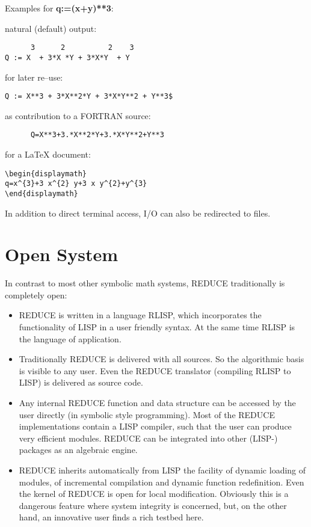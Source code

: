 Examples for {\bf q:=(x+y)**3}:

natural (default) output:
\begin{verbatim}
      3      2          2    3
Q := X  + 3*X *Y + 3*X*Y  + Y
\end{verbatim}
for later re--use:
\begin{verbatim}
Q := X**3 + 3*X**2*Y + 3*X*Y**2 + Y**3$
\end{verbatim}
as contribution to a FORTRAN source:
\begin{verbatim}
      Q=X**3+3.*X**2*Y+3.*X*Y**2+Y**3
\end{verbatim}
for a LaTeX document:
\begin{verbatim}
\begin{displaymath}
q=x^{3}+3 x^{2} y+3 x y^{2}+y^{3}
\end{displaymath}
\end{verbatim}
 
In addition to direct terminal access, I/O can also be redirected to
files.
\section{Open System}
 
In contrast to most other symbolic math systems, {\small REDUCE}
traditionally is completely open:
 
\begin{itemize}
\item {\small REDUCE} is written in a language {\small RLISP}, which
incorporates the functionality of {\small LISP} in a user friendly syntax.
At the same time {\small RLISP} is the language of application.

\item Traditionally {\small REDUCE} is delivered with all sources.  So the
algorithmic basis is visible to any user.  Even the {\small REDUCE}
translator (compiling {\small RLISP} to {\small LISP}) is delivered as
source code.

\item Any internal {\small REDUCE} function and data structure can be
accessed by the user directly (in symbolic style programming).  Most of
the {\small REDUCE} implementations contain a {\small LISP} compiler, such
that the user can produce very efficient modules. {\small REDUCE} can be
integrated into other ({\small LISP}-) packages as an algebraic engine.

\item {\small REDUCE} inherits automatically from {\small LISP} the
facility of dynamic loading of modules, of incremental compilation and
dynamic function redefinition.  Even the kernel of {\small REDUCE} is open
for local modification.  Obviously this is a dangerous feature where
system integrity is concerned, but, on the other hand, an innovative user
finds a rich testbed here.
\end{itemize}

